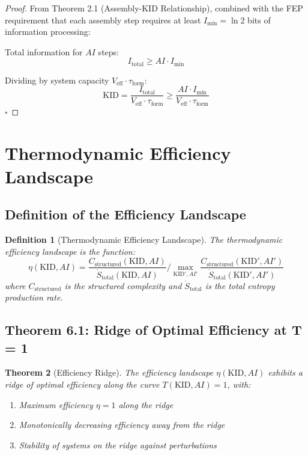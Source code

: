 \documentclass[11pt,a4paper]{article}
\newtheorem{theorem}{Theorem}[section]
\newtheorem{definition}[theorem]{Definition}
\begin{document}
\begin{proof}
From Theorem 2.1 (Assembly-KID Relationship), combined with the FEP requirement that each assembly step requires at least $I_{\min} = \ln 2$ bits of information processing:

Total information for $AI$ steps:
\begin{equation}
I_{\text{total}} \geq AI \cdot I_{\min}
\end{equation}

Dividing by system capacity $V_{\text{eff}} \cdot \tau_{\text{form}}$:
\begin{equation}
\text{KID} = \frac{I_{\text{total}}}{V_{\text{eff}} \cdot \tau_{\text{form}}} \geq \frac{AI \cdot I_{\min}}{V_{\text{eff}} \cdot \tau_{\text{form}}}
\end{equation}
\hfill $\square$
\end{proof}


\section{Thermodynamic Efficiency Landscape}

\subsection{Definition of the Efficiency Landscape}

\begin{definition}[Thermodynamic Efficiency Landscape]
The thermodynamic efficiency landscape is the function:
\begin{equation}
\eta(\text{KID}, AI) = \frac{C_{\text{structured}}(\text{KID}, AI)}{\dot{S}_{\text{total}}(\text{KID}, AI)} \Big/ \max_{\text{KID}', AI'} \frac{C_{\text{structured}}(\text{KID}', AI')}{\dot{S}_{\text{total}}(\text{KID}', AI')}
\end{equation}
where $C_{\text{structured}}$ is the structured complexity and $\dot{S}_{\text{total}}$ is the total entropy production rate.
\end{definition}

\subsection{Theorem 6.1: Ridge of Optimal Efficiency at T = 1}

\begin{theorem}[Efficiency Ridge]
The efficiency landscape $\eta(\text{KID}, AI)$ exhibits a ridge of optimal efficiency along the curve $T(\text{KID}, AI) = 1$, with:
\begin{enumerate}[label=(\roman*)]
\item Maximum efficiency $\eta = 1$ along the ridge
\item Monotonically decreasing efficiency away from the ridge
\item Stability of systems on the ridge against perturbations
\end{enumerate}
\end{theorem}
\end{document}
